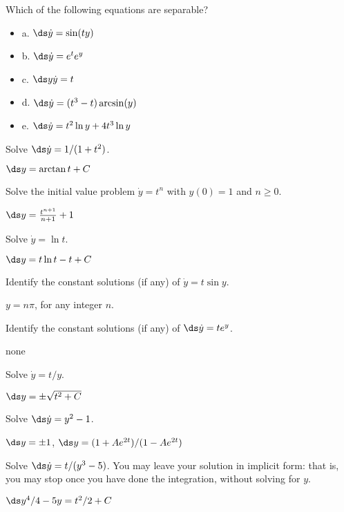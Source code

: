 \begin{exercises}

\exercise Which of the following equations are separable?

\begin{itemize} %
\item{a.} $\ds \dot{y} = \sin (ty)$
\item{b.} $\ds \dot{y} = e^t e^y $
\item{c.} $\ds y\dot{y} = t $
\item{d.} $\ds \dot{y} = (t^3 -t) \arcsin(y)$
\item{e.} $\ds \dot{y} = t^2 \ln y + 4t^3 \ln y $

\end{itemize}

\exercise Solve $\ds\dot{y} = 1/(1+t^2)$.
\begin{answer} $\ds y=\arctan t + C$
\end{answer}

\exercise Solve the initial value problem $\dot{y} = t^n$ with
$y(0)=1$ and $n\ge 0$.
\begin{answer} $\ds y={t^{n+1}\over n+1}+1$
\end{answer}

\exercise Solve $\dot{y} = \ln t$. 
\begin{answer} $\ds y=t\ln t-t+C$
\end{answer}

\exercise Identify the constant solutions (if any) of $\dot{y} =t\sin y$.
\begin{answer} $y=n\pi$, for any integer $n$.
\end{answer}

\exercise Identify the constant solutions (if any) of $\ds\dot{y}=te^y$.
\begin{answer} none
\end{answer}

\exercise Solve $\dot{y} = t/y$.
\begin{answer} $\ds y=\pm\sqrt{t^2+C}$
\end{answer}

\exercise Solve $\ds\dot{y} = y^2 -1$.
\begin{answer} $\ds y=\pm 1$, $\ds y=(1+Ae^{2t})/(1-Ae^{2t})$
\end{answer}

\exercise Solve $\ds\dot{y} = t/(y^3 - 5)$. You may leave
your solution in implicit form: that is, you may stop once you have
done the integration, without solving for $y$.
\begin{answer} $\ds y^4/4-5y=t^2/2+C$
\end{answer}


\end{exercises}
